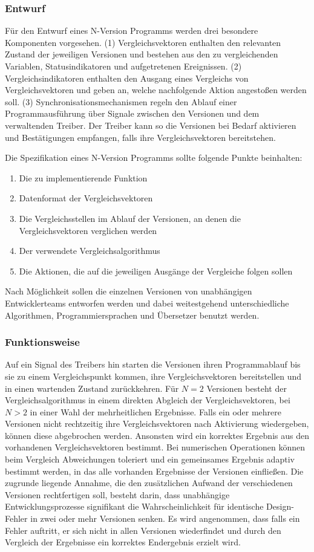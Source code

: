 \subsubsection{Entwurf}
Für den Entwurf eines N-Version Programms werden drei besondere Komponenten vorgesehen.
(1) Vergleichsvektoren enthalten den relevanten Zustand der jeweiligen Versionen und bestehen aus den zu vergleichenden Variablen, Statusindikatoren und aufgetretenen Ereignissen.
(2) Vergleichsindikatoren enthalten den Ausgang eines Vergleichs von Vergleichsvektoren und geben an, welche nachfolgende Aktion angestoßen werden soll. 
(3) Synchronisationsmechanismen regeln den Ablauf einer Programmausführung über Signale zwischen den Versionen und dem verwaltenden Treiber. Der Treiber kann so die Versionen bei Bedarf aktivieren und Bestätigungen empfangen, falls ihre Vergleichsvektoren bereitstehen.

Die Spezifikation eines N-Version Programms sollte folgende Punkte beinhalten:
\begin{enumerate}
	\item Die zu implementierende Funktion
	\item Datenformat der Vergleichsvektoren
	\item Die Vergleichsstellen im Ablauf der Versionen, an denen die Vergleichsvektoren verglichen werden
	\item Der verwendete Vergleichsalgorithmus
	\item Die Aktionen, die auf die jeweiligen Ausgänge der Vergleiche folgen sollen
\end{enumerate}
%
Nach Möglichkeit sollen die einzelnen Versionen von unabhängigen Entwicklerteams entworfen werden und dabei weitestgehend unterschiedliche Algorithmen, Programmiersprachen und Übersetzer benutzt werden.


\subsubsection{Funktionsweise}

Auf ein Signal des Treibers hin starten die Versionen ihren Programmablauf bis sie zu einem Vergleichspunkt kommen, ihre Vergleichsvektoren bereitstellen und in einen wartenden Zustand zurückkehren.
Für $N = 2$ Versionen besteht der Vergleichsalgorithmus in einem direkten Abgleich der Vergleichsvektoren, bei $N > 2$ in einer Wahl der mehrheitlichen Ergebnisse. Falls ein oder mehrere Versionen nicht rechtzeitig ihre Vergleichsvektoren nach Aktivierung wiedergeben, können diese abgebrochen werden. Ansonsten wird ein korrektes Ergebnis aus den vorhandenen Vergleichsvektoren bestimmt. Bei numerischen Operationen können beim Vergleich Abweichungen toleriert und ein gemeinsames Ergebnis adaptiv bestimmt werden, in das alle vorhanden Ergebnisse der Versionen einfließen. 
Die zugrunde liegende Annahme, die den zusätzlichen Aufwand der verschiedenen Versionen rechtfertigen soll, besteht darin, dass unabhängige Entwicklungsprozesse signifikant die Wahrscheinlichkeit für identische Design-Fehler in zwei oder mehr Versionen senken.
Es wird angenommen, dass falls ein Fehler auftritt, er sich nicht in allen Versionen wiederfindet und durch den Vergleich der Ergebnisse ein korrektes Endergebnis erzielt wird.


